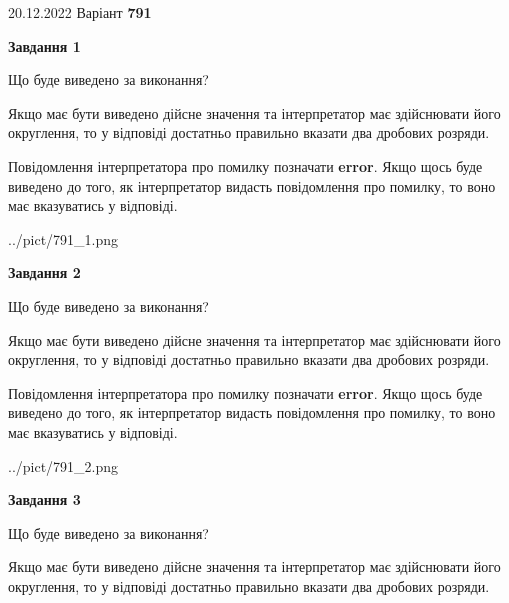 \documentclass[12pt, ukrainian]{article}
\begin{document}
{20.12.2022 Варіант \No \textbf { 791 }\par}
{
\begin {Large}

{\begin {center}\textbf{Завдання 1}\end {center}}\par
Що буде виведено за виконання? \par

Якщо має бути виведено дійсне значення та інтерпретатор має здійснювати його округлення, 
то у відповіді достатньо правильно вказати два дробових розряди.

Повідомлення інтерпретатора про помилку позначати \textbf{error}.
Якщо щось буде виведено до того, як інтерпретатор видасть повідомлення про помилку, 
то воно має вказуватись у відповіді. \par

\begin{center}
	{../pict/791_1.png}
\end{center}
\newpage

{\begin {center}\textbf{Завдання 2}\end {center}}\par
Що буде виведено за виконання? \par

Якщо має бути виведено дійсне значення та інтерпретатор має здійснювати його округлення, 
то у відповіді достатньо правильно вказати два дробових розряди.

Повідомлення інтерпретатора про помилку позначати \textbf{error}.
Якщо щось буде виведено до того, як інтерпретатор видасть повідомлення про помилку, 
то воно має вказуватись у відповіді. \par

\begin{center}
	{../pict/791_2.png}
\end{center}
\newpage

{\begin {center}\textbf{Завдання 3}\end {center}}\par
Що буде виведено за виконання? \par

Якщо має бути виведено дійсне значення та інтерпретатор має здійснювати його округлення, 
то у відповіді достатньо правильно вказати два дробових розряди.


\end{Large}}
\end{document}
